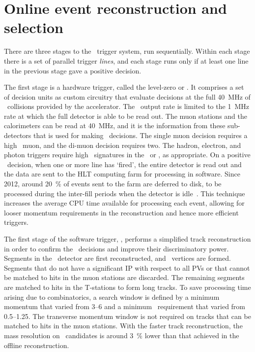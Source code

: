 \section{Online event reconstruction and selection}
\label{chap:intro:lhcb:trigger}

There are three stages to the \lhcb\ trigger system, run sequentially.
Within each stage there is a set of parallel trigger \emph{lines}, and each 
stage runs only if at least one line in the previous stage gave a positive 
decision.

The first stage is a hardware trigger, called the level-zero or \lzero.
It comprises a set of decision units as custom circuitry that evaluate 
decisions at the full \SI{40}{\mega\hertz} of \pp\ collisions provided by the 
accelerator.
The \lzero\ output rate is limited to the \SI{1}{\mega\hertz} rate at which the 
full detector is able to be read out.
The muon stations and the calorimeters can be read at \SI{40}{\mega\hertz}, and 
it is the information from these sub-detectors that is used for making \lzero\ 
decisions.
The single muon decision requires a high \pT\ muon, and the di-muon decision 
requires two.
The hadron, electron, and photon triggers require high \ET\ signatures in the 
\hcal\ or \ecal, as appropriate.
On a positive \lzero\ decision, when one or more line has `fired', the entire 
detector is read out and the data are sent to the \ac{HLT} computing farm for 
processing in software.
Since 2012, around \SI{20}{\percent} of events sent to the farm are deferred to 
disk, to be processed during the inter-fill periods when the detector is 
idle~\cite{1742-6596-513-1-012006}.
This technique increases the average CPU time available for processing each 
event, allowing for looser momentum requirements in the reconstruction and 
hence more efficient triggers.

The first stage of the software trigger, \hltone, performs a simplified track 
reconstruction in order to confirm the \lzero\ decisions and improve their 
discriminatory power.
Segments in the \velo\ detector are first reconstructed, and \pp\ vertices are 
formed.
Segments that do not have a significant \ac{IP} with respect to all \acp{PV} or 
that cannot be matched to hits in the muon stations are discarded.
The remaining segments are matched to hits in the T-stations to form long 
tracks.
To save processing time arising due to combinatorics, a search window is 
defined by a minimum momentum that varied from \SIrange{3}{6}{\GeVc} and a 
minimum \pT\ requirement that varied from \SIrange{0.5}{1.25}{\GeVc}.
The transverse momentum window is not required on tracks that can be matched to 
hits in the muon stations.
With the faster track reconstruction, the mass resolution on \JpsiTomumu\ 
candidates is around \SI{3}{\percent} lower than that achieved in the offline 
reconstruction.

